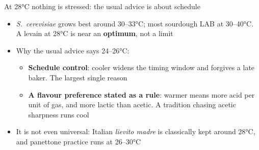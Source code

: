 \documentclass[aspectratio=169,11pt]{beamer}
\begin{document}
\begin{frame}{At 28°C nothing is stressed: the usual advice is about schedule}
  \begin{itemize}\setlength{\itemsep}{0.3em}
    \item \textit{S.~cerevisiae} grows best around 30–33°C; most sourdough LAB at
      30–40°C. A levain at 28°C is near an \textbf{optimum}, not a limit
    \item Why the usual advice says 24–26°C:
      \begin{itemize}
        \item \textbf{Schedule control}: cooler widens the timing window and forgives a
          late baker. The largest single reason
        \item \textbf{A flavour preference stated as a rule}: warmer means more acid per
          unit of gas, and more lactic than acetic. A tradition chasing acetic sharpness
          runs cool
      \end{itemize}
    \item It is not even universal: Italian \emph{lievito madre} is classically kept
      around 28°C, and panettone practice runs at 26–30°C
  \end{itemize}
\end{frame}
\end{document}
